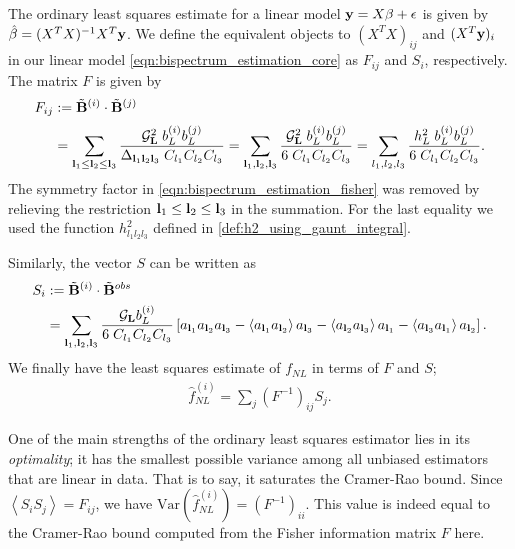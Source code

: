 The ordinary least squares estimate for a linear model $\mathbf{y} = X\mathbf{\beta} + \mathbf{\epsilon}$ is given by $\hat{\beta} = (X^T X)^{-1} X^T \mathbf{y}$. We define the equivalent objects to $(X^T X)_{ij}$ and $(X^T \mathbf{y})_i$ in our linear model \eqref{eqn:bispectrum_estimation_core} as $F_{ij}$ and $S_i$, respectively. The matrix $F$ is given by
\begin{align}
	F_{ij} &:= \tilde{\mathbf{B}}^{(i)} \cdot \tilde{\mathbf{B}}^{(j)} \\[0.5ex]
	&= \sum_{\mathbf{l}_1 \le \mathbf{l}_2 \le \mathbf{l}_3}  \frac{\mathcal{G}_{\mathbf{L}}^2 \; b^{(i)}_{L} b^{(j)}_{L}}{\Delta_{\mathbf{l}_1 \mathbf{l}_2 \mathbf{l}_3} \; C_{l_1} C_{l_2} C_{l_3}}   
	= \sum_{\mathbf{l}_1 , \mathbf{l}_2 , \mathbf{l}_3}  \frac{\mathcal{G}_{\mathbf{L}}^2 \; b^{(i)}_{L} b^{(j)}_{L}}{6 \; C_{l_1} C_{l_2} C_{l_3}}
	= \sum_{l_1,l_2,l_3}  \frac{h^2_L \; b^{(i)}_{L} b^{(j)}_{L}}{6 \; C_{l_1} C_{l_2} C_{l_3}}. \label{eqn:bispectrum_estimation_fisher}
\end{align}
The symmetry factor in \eqref{eqn:bispectrum_estimation_fisher} was removed by relieving the restriction $\mathbf{l}_1 \le \mathbf{l}_2 \le \mathbf{l}_3$ in the summation. For the last equality we used the function $h^2_{l_1 l_2 l_3}$ defined in \eqref{def:h2_using_gaunt_integral}.

Similarly, the vector $S$ can be written as
\begin{align}
	S_i &:= \tilde{\mathbf{B}}^{(i)} \cdot \tilde{\mathbf{B}}^{obs} \\
	&= \sum_{\mathbf{l}_1 , \mathbf{l}_2 , \mathbf{l}_3} \frac{\mathcal{G}_{\mathbf{L}} b^{(i)}_{L}}{6 \; C_{l_1} C_{l_2} C_{l_3}} \left[ a_{\mathbf{l}_1} a_{\mathbf{l}_2} a_{\mathbf{l}_3} - \left< a_{\mathbf{l}_1} a_{\mathbf{l}_2} \right> a_{\mathbf{l}_3} - \left< a_{\mathbf{l}_2} a_{\mathbf{l}_3} \right> a_{\mathbf{l}_1} - \left< a_{\mathbf{l}_3} a_{\mathbf{l}_1} \right> a_{\mathbf{l}_2} \right].
	\label{eqn:bispectrum_estimation_signal}
\end{align}
We finally have the least squares estimate of $f_{NL}$ in terms of $F$ and $S$;
\begin{align}
	\hat{f}_{NL}^{(i)} = \sum_j (F^{-1})_{ij} S_j. \label{eqn:bispectrum_estimation_ols_estimate}
\end{align}

One of the main strengths of the ordinary least squares estimator lies in its \textit{optimality}; it has the smallest possible variance among all unbiased estimators that are linear in data. That is to say, it saturates the Cramer-Rao bound. Since $\left< S_i S_j \right> = F_{ij}$, we have $\text{Var}(\hat{f}_{NL}^{(i)}) = (F^{-1})_{ii}$. This value is indeed equal to the Cramer-Rao bound computed from the Fisher information matrix $F$ here.

